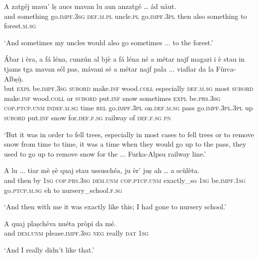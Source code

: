 \begin{linenumbers}
\gll   A zatgéj mava' lṣ aucs mavan lu aun anzatgé … ád uáut.\\
 and something go.\textsc{impf.3sg}  \textsc{def.m.pl} uncle.\textsc{pl}  go.\textsc{impf.3pl} then also something {} to forest.\textsc{m.sg} \\
\end{linenumbers}
\medskip
\glt `And sometimes my uncles would also go sometimes ... to the forest.'
\medskip

\begin{linenumbers}
\gll   Ábar i èra, a fá léna, cunzún al bjè a fá léna né a métar najf magari i è stau in tjams tga mavan sél pas, mávani sé a métar najf pala ... viafíar da la Fùrca-Albṣù̱. \\
but \textsc{expl} be.\textsc{impf.3sg} \textsc{subord} make.\textsc{inf} wood.\textsc{coll} especially \textsc{def.m.sg} most \textsc{subord} make.\textsc{inf} wood.\textsc{coll} or \textsc{subord} put.\textsc{inf} snow sometimes \textsc{expl} be.\textsc{prs.3sg} \textsc{cop.ptcp.unm} \textsc{indef.m.sg} time \textsc{rel} go.\textsc{impf.3pl} on.\textsc{def.m.sg} pass go.\textsc{impf.3pl.3pl} up \textsc{subord} put.\textsc{inf} snow for.\textsc{def.f.sg} {} railway of \textsc{def.f.sg} \textsc{pn}   \\
\end{linenumbers}
\medskip
\glt `But it was in order to fell trees, especially in most cases to fell trees or to remove snow from time to time, it was a time when they would go up to the pass, they used to go up to remove snow for the ... Furka-Alpsu railway line.'
\medskip

\begin{linenumbers}
\gll  A lu ... tiar mè ṣè quaj stau ussuschéa, ju èr’ juṣ ah … a scùlèta.  \\
 and then {} by \textsc{1sg} \textsc{cop.prs.3sg} \textsc{dem.unm} \textsc{cop.ptcp.unm} exactly\_so \textsc{1sg}  be.\textsc{impf.1sg} go.\textsc{ptcp.m.sg} eh {} to nursery\_school.\textsc{f.sg} \\
\end{linenumbers}
\medskip
\glt `And then with me it was exactly like this; I had gone to nursery school.'
\medskip

\begin{linenumbers}
\gll A quaj plaṣchéva nuéta pròpi da mé. \\
and \textsc{dem.unm} please.\textsc{impf.3sg} \textsc{neg} really \textsc{dat} \textsc{1sg}   \\
\end{linenumbers}
\medskip
\glt `And I really didn’t like that.'
\medskip

